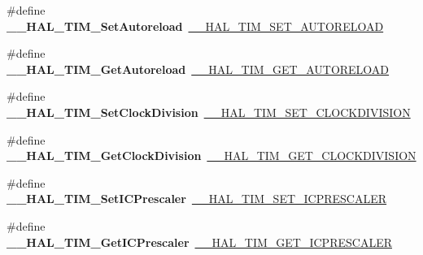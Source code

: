 \begin{DoxyCompactItemize}
\#define {\bfseries \+\_\+\+\_\+\+H\+A\+L\+\_\+\+T\+I\+M\+\_\+\+Set\+Autoreload}~\hyperlink{group___t_i_m___exported___macros_ga1e6300cab1e34ecaaf490dc7d4812d69}{\+\_\+\+\_\+\+H\+A\+L\+\_\+\+T\+I\+M\+\_\+\+S\+E\+T\+\_\+\+A\+U\+T\+O\+R\+E\+L\+O\+AD}
\item 
\mbox{\label{group___h_a_l___t_i_m___aliased___macros_gae96afd3a280ee1faf2551537e6618ee4}} 
\#define {\bfseries \+\_\+\+\_\+\+H\+A\+L\+\_\+\+T\+I\+M\+\_\+\+Get\+Autoreload}~\hyperlink{group___t_i_m___exported___macros_gaa7a5c7645695bad15bacd402513a028a}{\+\_\+\+\_\+\+H\+A\+L\+\_\+\+T\+I\+M\+\_\+\+G\+E\+T\+\_\+\+A\+U\+T\+O\+R\+E\+L\+O\+AD}
\item 
\mbox{\label{group___h_a_l___t_i_m___aliased___macros_ga8b8f3cf144c4058ec55e6e3659c6a68f}} 
\#define {\bfseries \+\_\+\+\_\+\+H\+A\+L\+\_\+\+T\+I\+M\+\_\+\+Set\+Clock\+Division}~\hyperlink{group___t_i_m___exported___macros_ga8aa84d77c670890408092630f9b2bdc4}{\+\_\+\+\_\+\+H\+A\+L\+\_\+\+T\+I\+M\+\_\+\+S\+E\+T\+\_\+\+C\+L\+O\+C\+K\+D\+I\+V\+I\+S\+I\+ON}
\item 
\mbox{\label{group___h_a_l___t_i_m___aliased___macros_gaaf835e3864f2ba2e2026d417ad0d5e40}} 
\#define {\bfseries \+\_\+\+\_\+\+H\+A\+L\+\_\+\+T\+I\+M\+\_\+\+Get\+Clock\+Division}~\hyperlink{group___t_i_m___exported___macros_gae6bc91bb5940bce52828c690f24001b8}{\+\_\+\+\_\+\+H\+A\+L\+\_\+\+T\+I\+M\+\_\+\+G\+E\+T\+\_\+\+C\+L\+O\+C\+K\+D\+I\+V\+I\+S\+I\+ON}
\item 
\mbox{\label{group___h_a_l___t_i_m___aliased___macros_ga1cb3c9854441539ebe076fba62c36d22}} 
\#define {\bfseries \+\_\+\+\_\+\+H\+A\+L\+\_\+\+T\+I\+M\+\_\+\+Set\+I\+C\+Prescaler}~\hyperlink{group___t_i_m___exported___macros_gaeb106399b95ef02cec502f58276a0e92}{\+\_\+\+\_\+\+H\+A\+L\+\_\+\+T\+I\+M\+\_\+\+S\+E\+T\+\_\+\+I\+C\+P\+R\+E\+S\+C\+A\+L\+ER}
\item 
\mbox{\label{group___h_a_l___t_i_m___aliased___macros_gae8d82e4e04e81f7a023a45b73c9705b7}} 
\#define {\bfseries \+\_\+\+\_\+\+H\+A\+L\+\_\+\+T\+I\+M\+\_\+\+Get\+I\+C\+Prescaler}~\hyperlink{group___t_i_m___exported___macros_gabfeec6b3c67a5747c7dbd20aff61d8e2}{\+\_\+\+\_\+\+H\+A\+L\+\_\+\+T\+I\+M\+\_\+\+G\+E\+T\+\_\+\+I\+C\+P\+R\+E\+S\+C\+A\+L\+ER}

\end{DoxyCompactItemize}
